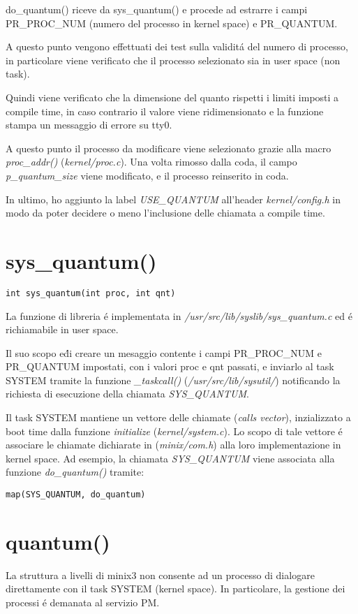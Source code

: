 \documentclass[a4paper,12pt]{report}
\begin{document}
do\_quantum() riceve da sys\_quantum() e procede ad estrarre i campi
PR\_PROC\_NUM (numero del processo in kernel space) e PR\_QUANTUM.

A questo punto vengono effettuati dei test sulla validit\'a del numero di
processo, in particolare viene verificato che il processo selezionato sia in
user space (non task).

Quindi viene verificato che la dimensione del quanto rispetti i limiti imposti a
compile time, in caso contrario il valore viene ridimensionato e la funzione
stampa un messaggio di errore su tty0.

A questo punto il processo da modificare viene selezionato grazie alla macro
\textit{proc\_addr()} (\textit{kernel/proc.c}).
Una volta rimosso dalla coda, il campo \textit{p\_quantum\_size} viene modificato, e
il processo reinserito in coda.

In ultimo, ho aggiunto la label \textit{USE\_QUANTUM} all'header
\textit{kernel/config.h} in modo da poter decidere o meno l'inclusione delle
chiamata a compile time.

\section{sys\_quantum()}
\begin{verbatim}
int sys_quantum(int proc, int qnt)
\end{verbatim}

La funzione di libreria \'e implementata in
\textit{/usr/src/lib/syslib/sys\_quantum.c} ed \'e richiamabile in user
space.

Il suo scopo e\' di creare un mesaggio contente i campi PR\_PROC\_NUM 
e PR\_QUANTUM impostati, con i valori proc e qnt passati, e
inviarlo al task SYSTEM tramite la funzione \textit{\_taskcall()}
(\textit{/usr/src/lib/sysutil/}) notificando la richiesta di esecuzione
della chiamata \textit{SYS\_QUANTUM}. 

Il task SYSTEM mantiene un vettore delle chiamate (\textit{calls vector}),
inzializzato a boot time dalla funzione \textit{initialize}
(\textit{kernel/system.c}).
Lo scopo di tale vettore \'e associare le chiamate  dichiarate in
(\textit{minix/com.h}) alla loro implementazione in kernel space.
Ad esempio, la chiamata \textit{SYS\_QUANTUM} viene associata alla funzione
\textit{do\_quantum()} tramite:
\begin{verbatim}
map(SYS_QUANTUM, do_quantum)
\end{verbatim}

\section{quantum()}
La struttura a livelli di minix3 non consente ad un processo di dialogare
direttamente con il task SYSTEM (kernel space).
In particolare, la gestione dei processi \'e demanata al servizio PM.
\end{document}
